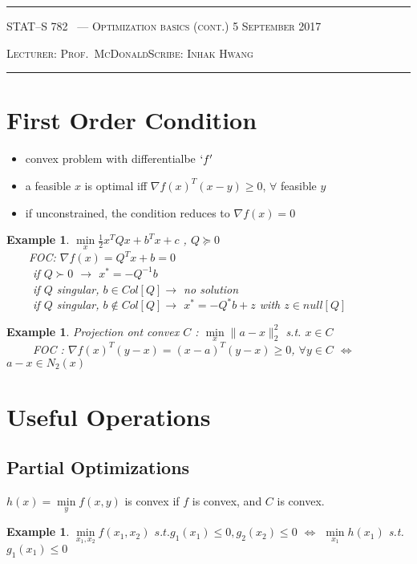 \documentclass[10pt]{article}
\newcounter{lecnum}
\newtheorem{example}[ex]{Example}
\newcommand{\minl}{\min\limits}
\newcommand{\lecturer}{Prof.\ McDonald}
\newcommand{\scribe}{Inhak Hwang}
\newcommand{\chtitle}{Optimization basics (cont.)}
\newcommand{\lecdate}{5 September 2017}
\begin{document}
\rule{6.5in}{1pt}

\textsc{STAT--S 782
        \hfill \thelecnum\ --- \chtitle
        \hfill \lecdate}

\textsc{Lecturer: \lecturer \hfill Scribe: \scribe}
\rule{6.5in}{1pt}



\section{First Order Condition}
\label{sec:terminology}

\begin{itemize}
  \item convex problem with differentialbe $`f'$
  \item a feasible $x$ is optimal iff $\nabla f(x)^{T}( x - y) \ge 0$, $\forall$ feasible $y$
  \item if unconstrained, the condition reduces to $\nabla f(x)  = 0 $
\end{itemize}


\begin{example}
  $\minl_x \frac{1}{2}x^{T}Q x + b^{T}x + c $ , $Q \succeq 0$ \\
      $\qquad$FOC: $\nabla f(x) = Q^{T}x + b = 0$  \\
	$\qquad$ if $Q \succ 0 $ $\rightarrow$ $x^{*} = -Q^{-1}b$ \\
	$\qquad$ if $Q$ singular, $b \in Col[Q] \rightarrow$ no solution \\
     $\qquad$ if $Q$ singular, $b \notin Col[Q] \rightarrow$ $x^{*} = -Q^{*}b + z $ with $z \in null[Q]$
\end{example}

\begin{example}
 Projection ont convex $C$ : $\min\limits_{x} \|a-x\|_{2}^{2}$ s.t. $x\in C$\\
$\qquad$ FOC : $\nabla f(x)^{T}(y-x) = (x - a)^{T}(y - x) \ge 0$, $\forall y\in C$ $\Leftrightarrow$ $a-x \in N_{2}(x)$
\end{example}


\section{Useful Operations}
\subsection{Partial Optimizations}
$h(x) = \min\limits_{y}f(x,y) $ is convex if $f$ is convex, and $C$ is convex.
\begin{example}
$\min\limits_{x_{1},x_{2}} f(x_{1},x_{2})$  $s.t. g_{1}(x_{1}) \le 0, g_{2}(x_{2}) \le 0$  $\Leftrightarrow$ $ \min\limits_{x_{1}}h(x_{1})$ s.t. $g_{1}(x_{1}) \le 0$
\end{example}
\end{document}
